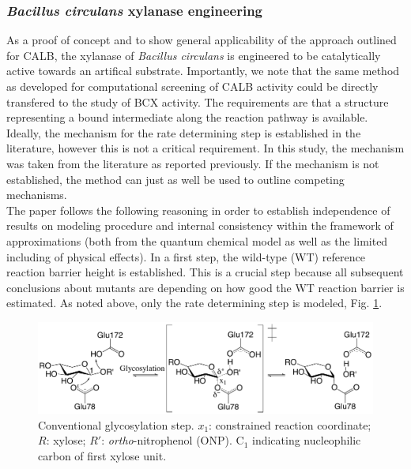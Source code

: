 \subsubsection{\textit{Bacillus circulans} xylanase engineering}
As a proof of concept and to show general applicability of the approach outlined for CALB, the xylanase of \textit{Bacillus circulans} is engineered to be catalytically active towards an artifical substrate.
Importantly, we note that the same method as developed for computational screening of CALB activity could be directly transfered to the study of BCX activity.
The requirements are that a structure representing a bound intermediate along the reaction pathway is available.
Ideally, the mechanism for the rate determining step is established in the literature, however this is not a critical requirement.
In this study, the mechanism was taken from the literature as reported previously\cite{joshi2000hydrogen,joshi2001dissecting}.
If the mechanism is not established, the method can just as well be used to outline competing mechanisms.\\
The paper follows the following reasoning in order to establish independence of results on modeling procedure and internal consistency within the framework of approximations (both from the quantum chemical model as well as the limited including of physical effects).
In a first step, the wild-type (WT) reference reaction barrier height is established.
This is a crucial step because all subsequent conclusions about mutants are depending on how good the WT reaction barrier is estimated.
As noted above, only the rate determining step is modeled, Fig. \ref{fig:bcx_mechanism}.
\begin{figure}[htbp] 
\centering
\includegraphics[width=1.0\linewidth]{mechanism.pdf}
\caption{
Conventional glycosylation step. $x_1$: constrained reaction coordinate; $R$: xylose; 
$R'$: \textit{ortho}-nitrophenol (ONP).
C$_1$ indicating nucleophilic carbon of first xylose unit.
}
\label{fig:bcx_mechanism}
\end{figure}

